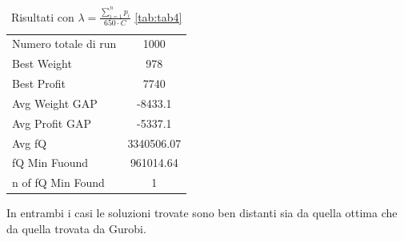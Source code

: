 \documentclass[a4paper,12pt]{article}
\begin{document}
\begin{table}[H]
\centering
\begin{tabular}{lc}
\toprule
Numero totale di run & 1000 \\
Best Weight & 978 \\
Best Profit & 7740 \\
Avg Weight GAP & -8433.1 \\
Avg Profit GAP & -5337.1 \\
Avg fQ & 3340506.07 \\
fQ Min Fuound & 961014.64 \\
n of fQ Min Found & 1 \\
\bottomrule
\end{tabular}
\caption{Risultati con $\lambda = \displaystyle \frac{\sum_{i=1}^{n} p_i}{650 \cdot C}$ \ref{tab:tab4}}
\end{table}

In entrambi i casi le soluzioni trovate sono ben distanti sia da quella ottima che da quella trovata da Gurobi.
\end{document}
